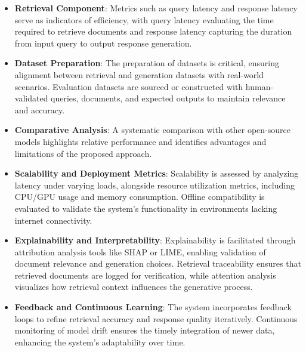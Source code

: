 \begin{itemize}
    \item \textbf{Retrieval Component}: Metrics such as query latency and response latency serve as indicators of efficiency, with query latency evaluating the time required to retrieve documents and response latency capturing the duration from input query to output response generation.
    \item \textbf{Dataset Preparation}: The preparation of datasets is critical, ensuring alignment between retrieval and generation datasets with real-world scenarios. Evaluation datasets are sourced or constructed with human-validated queries, documents, and expected outputs to maintain relevance and accuracy.
    \item \textbf{Comparative Analysis}: A systematic comparison with other open-source models highlights relative performance and identifies advantages and limitations of the proposed approach.
    \item \textbf{Scalability and Deployment Metrics}: Scalability is assessed by analyzing latency under varying loads, alongside resource utilization metrics, including CPU/GPU usage and memory consumption. Offline compatibility is evaluated to validate the system's functionality in environments lacking internet connectivity.
    \item \textbf{Explainability and Interpretability}: Explainability is facilitated through attribution analysis tools like SHAP or LIME, enabling validation of document relevance and generation choices. Retrieval traceability ensures that retrieved documents are logged for verification, while attention analysis visualizes how retrieval context influences the generative process.
    \item \textbf{Feedback and Continuous Learning}: The system incorporates feedback loops to refine retrieval accuracy and response quality iteratively. Continuous monitoring of model drift ensures the timely integration of newer data, enhancing the system's adaptability over time.
\end{itemize}
